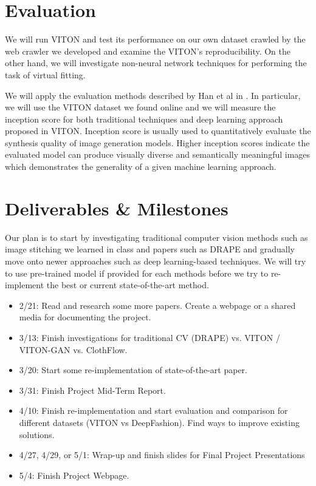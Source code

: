\documentclass{article}
\begin{document}
\section{Evaluation}\label{eval}

We will run VITON and test its performance on our own dataset crawled by the web crawler we developed and examine the VITON's reproducibility. On the other hand, we will investigate non-neural network techniques for performing the task of virtual fitting.

We will apply the evaluation methods described by Han et al in \cite{han2018viton}. In particular, we will use the VITON dataset we found online and we will measure the inception score for both traditional techniques and deep learning approach proposed in VITON.
Inception score is usually used to quantitatively evaluate the synthesis quality of image generation models. Higher inception scores indicate the evaluated model can produce visually diverse and semantically meaningful images which demonstrates the generality of a given machine learning approach. 

\section{Deliverables \& Milestones} \label{dev-stone}

Our plan is to start by investigating traditional computer vision methods such as image stitching we learned in class and papers such as DRAPE \cite{guan2012drape} and gradually move onto newer approaches such as deep learning-based techniques. We will try to use pre-trained model if provided for each methods before we try to re-implement the best or current state-of-the-art method.

\begin{itemize}
    \item 2/21: Read and research some more papers. Create a webpage or a shared media for documenting the project.
    \item 3/13: Finish investigations for traditional CV (DRAPE) vs. VITON / VITON-GAN vs. ClothFlow.
    \item 3/20: Start some re-implementation of state-of-the-art paper.
    \item 3/31: Finish Project Mid-Term Report.
    \item 4/10: Finish re-implementation and start evaluation and comparison for different datasets (VITON vs DeepFashion). Find ways to improve existing solutions.
    \item 4/27, 4/29, or 5/1: Wrap-up and finish slides for Final Project Presentations
    \item 5/4: Finish Project Webpage.
\end{itemize}
\end{document}
